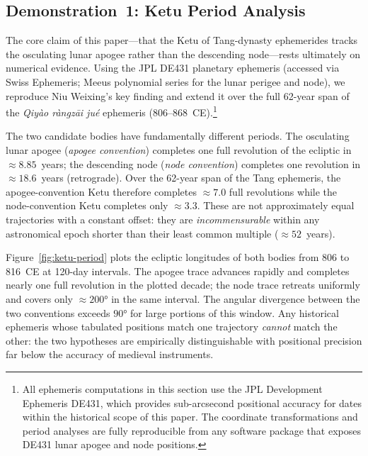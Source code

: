 \documentclass[10pt,a4paper]{article}
\providecommand{\degree}{\ensuremath{°}}
\begin{document}
\subsection*{Demonstration~1: Ketu Period Analysis}

The core claim of this paper---that the Ketu of Tang-dynasty ephemerides
tracks the osculating lunar apogee rather than the descending node---rests
ultimately on numerical evidence.  Using the JPL DE431 planetary ephemeris
(accessed via Swiss Ephemeris; Meeus polynomial series for the lunar perigee and
node), we reproduce Niu Weixing's key finding and extend it over the full
62-year span of the \textit{Qiy\`ao r\`angz\=ai ju\'e} ephemeris (806--868~CE).\footnote{All
  ephemeris computations in this section use the JPL Development Ephemeris
  DE431, which provides sub-arcsecond positional accuracy for dates within
  the historical scope of this paper.  The coordinate transformations and
  period analyses are fully reproducible from any software package that
  exposes DE431 lunar apogee and node positions.}

The two candidate bodies have fundamentally different periods.  The osculating
lunar apogee (\textit{apogee convention}) completes one full revolution of the
ecliptic in $\approx 8.85$~years; the descending node (\textit{node convention})
completes one revolution in $\approx 18.6$~years (retrograde).  Over the
62-year span of the Tang ephemeris, the apogee-convention Ketu therefore
completes $\approx 7.0$ full revolutions while the node-convention Ketu
completes only $\approx 3.3$.  These are not approximately equal trajectories
with a constant offset: they are \emph{incommensurable} within any astronomical
epoch shorter than their least common multiple ($\approx 52$~years).

Figure~\ref{fig:ketu-period} plots the ecliptic longitudes of both bodies from
806 to 816~CE at 120-day intervals.  The apogee trace advances rapidly and
completes nearly one full revolution in the plotted decade; the node trace
retreats uniformly and covers only $\approx 200\degree$ in the same interval.
The angular divergence between the two conventions exceeds $90\degree$ for
large portions of this window.  Any historical ephemeris whose tabulated
positions match one trajectory \emph{cannot} match the other: the two
hypotheses are empirically distinguishable with positional precision far
below the accuracy of medieval instruments.
\end{document}
